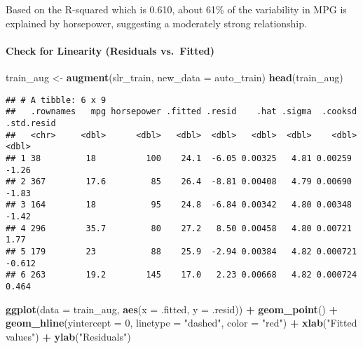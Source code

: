 \documentclass[
]{article}
\newenvironment{Shaded}{\begin{snugshade}}{\end{snugshade}}
\newcommand{\AttributeTok}[1]{\textcolor[rgb]{0.13,0.29,0.53}{#1}}
\newcommand{\DecValTok}[1]{\textcolor[rgb]{0.00,0.00,0.81}{#1}}
\newcommand{\FunctionTok}[1]{\textcolor[rgb]{0.13,0.29,0.53}{\textbf{#1}}}
\newcommand{\NormalTok}[1]{#1}
\newcommand{\OtherTok}[1]{\textcolor[rgb]{0.56,0.35,0.01}{#1}}
\newcommand{\SpecialCharTok}[1]{\textcolor[rgb]{0.81,0.36,0.00}{\textbf{#1}}}
\newcommand{\StringTok}[1]{\textcolor[rgb]{0.31,0.60,0.02}{#1}}
\begin{document}
Based on the R-squared which is 0.610, about 61\% of the variability in
MPG is explained by horsepower, suggesting a moderately strong
relationship.

\paragraph{Check for Linearity (Residuals
vs.~Fitted)}\label{check-for-linearity-residuals-vs.-fitted}

\begin{Shaded}
\begin{Highlighting}[]
\NormalTok{train\_aug }\OtherTok{\textless{}{-}} \FunctionTok{augment}\NormalTok{(slr\_train, }\AttributeTok{new\_data =}\NormalTok{ auto\_train)}
\FunctionTok{head}\NormalTok{(train\_aug)}
\end{Highlighting}
\end{Shaded}

\begin{verbatim}
## # A tibble: 6 x 9
##   .rownames   mpg horsepower .fitted .resid    .hat .sigma  .cooksd .std.resid
##   <chr>     <dbl>      <dbl>   <dbl>  <dbl>   <dbl>  <dbl>    <dbl>      <dbl>
## 1 38         18          100    24.1  -6.05 0.00325   4.81 0.00259      -1.26 
## 2 367        17.6         85    26.4  -8.81 0.00408   4.79 0.00690      -1.83 
## 3 164        18           95    24.8  -6.84 0.00342   4.80 0.00348      -1.42 
## 4 296        35.7         80    27.2   8.50 0.00458   4.80 0.00721       1.77 
## 5 179        23           88    25.9  -2.94 0.00384   4.82 0.000721     -0.612
## 6 263        19.2        145    17.0   2.23 0.00668   4.82 0.000724      0.464
\end{verbatim}

\begin{Shaded}
\begin{Highlighting}[]
\FunctionTok{ggplot}\NormalTok{(}\AttributeTok{data =}\NormalTok{ train\_aug, }\FunctionTok{aes}\NormalTok{(}\AttributeTok{x =}\NormalTok{ .fitted, }\AttributeTok{y =}\NormalTok{ .resid)) }\SpecialCharTok{+}
  \FunctionTok{geom\_point}\NormalTok{() }\SpecialCharTok{+}
  \FunctionTok{geom\_hline}\NormalTok{(}\AttributeTok{yintercept =} \DecValTok{0}\NormalTok{, }\AttributeTok{linetype =} \StringTok{"dashed"}\NormalTok{, }\AttributeTok{color =} \StringTok{"red"}\NormalTok{) }\SpecialCharTok{+}
  \FunctionTok{xlab}\NormalTok{(}\StringTok{"Fitted values"}\NormalTok{) }\SpecialCharTok{+}
  \FunctionTok{ylab}\NormalTok{(}\StringTok{"Residuals"}\NormalTok{)}
\end{Highlighting}
\end{Shaded}
\end{document}
